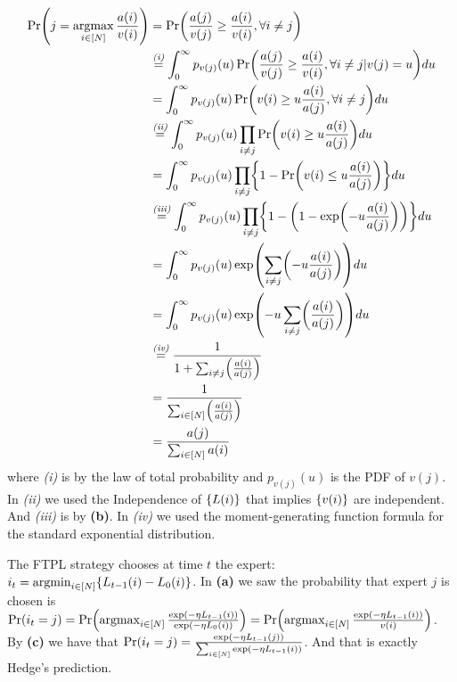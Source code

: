 \documentclass{article}
\DeclareMathOperator*{\argmin}{argmin}
\DeclareMathOperator*{\argmax}{argmax}
\DeclarePairedDelimiter\br{(}{)}%
\DeclarePairedDelimiter\brc{\{}{\}}%
\newcommand{\textrel}[2]{\stackrel{\textit{\text{#1}}}{#2} }
\begin{document}
\begin{align*}
\Pr \br*{j = \argmax_{i \in [N]} \frac{a(i)}{v(i)}} 
& = \Pr \br*{\frac{a(j)}{v(j)} \geq  \frac{a(i)}{v(i)}, \forall i \neq j} \\
& \textrel{(i)}{=}  \int_{0}^{\infty}   p_{v(j)}(u)  \Pr \br*{\frac{a(j)}{v(j)} \geq  \frac{a(i)}{v(i)}, \forall  i \neq j| v(j)=u} d u\\
&= \int_{0}^{\infty}   p_{v(j)}(u)  \Pr \br*{v(i) \geq u \frac{a(i)}{  a(j)  }, \forall  i \neq j} d u\\
&\textrel{(ii)}{=}  \int_{0}^{\infty}   p_{v(j)}(u) \prod_{ i \neq j} \Pr \br*{v(i) \geq u \frac{a(i)}{ a(j)}} d u\\
&= \int_{0}^{\infty}   p_{v(j)}(u) \prod_{ i \neq j} \brc*{1 - \Pr \br*{v(i) \leq u \frac{a(i)}{a(j)}}} d u\\
&\textrel{(iii)}{=}  \int_{0}^{\infty}   p_{v(j)}(u) \prod_{ i \neq j} \brc*{1 - \br*{1 -  \exp\br*{ - u \frac{a(i)}{a(j)}}}} d u\\
&= \int_{0}^{\infty}  p_{v(j)}(u)\exp\br*{ \sum_{ i \neq j}  \br*{ -u \frac{a(i)}{a(j)}}} d u\\
&=  \int_{0}^{\infty}  p_{v(j)}(u)\exp\br*{ -u   \sum_{ i \neq j}  \br*{\frac{a(i)}{a(j)}}} d u\\
&\textrel{(iv)}{=} \frac{1}{1+ \sum_{ i \neq j}  \br*{\frac{a(i)}{a(j)}}}\\
& =  \frac{1}{\sum_{ i \in [N]}  \br*{\frac{a(i)}{a(j)}}} \\
&= \frac{a(j)}{\sum_{ i \in [N]} a(i)}
\end{align*}
where \textit{(i)} is by the law of total probability and $p_{v(j)}(u)$ is the PDF of $v(j)$.
In \textit{(ii)} we used the Independence of $\brc{L(i)}$ that implies $\brc{v(i)}$  are independent. And \textit{(iii)} is by \textbf{(b)}. In \textit{(iv)} we used the moment-generating function formula for the standard exponential distribution. 

The FTPL strategy chooses at time $t$ the expert: $i_t = \argmin_{i \in [N]} \brc*{L_{t-1}(i) - L_0(i)}$.
In \textbf{(a)} we saw the probability that expert $j$ is chosen is  $\Pr(i_t=j) = \Pr \br*{\argmax_{i \in [N]} \frac{\exp \br*{ -\eta L_{t-1}(i)}}{\exp \br*{-\eta L_0(i)}} } = \Pr \br*{\argmax_{i \in [N]} \frac{\exp \br*{ -\eta L_{t-1}(i)}}{v(i)} }$.
By \textbf{(c)} we have that  $\Pr(i_t=j) = \frac{\exp\br*{-\eta L_{t-1}(j)}}{\sum_{i \in [N]} \exp\br*{-\eta L_{t-1}(i)}}$. And that is exactly Hedge's prediction.

\end{document}
